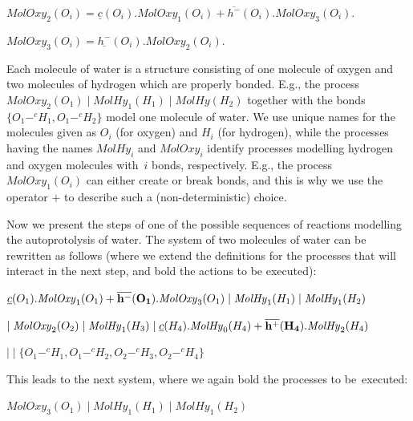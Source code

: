\documentclass[runningheads]{llncs}
\newcommand{\MolOxy}{\mathit{MolOxy}}
\newcommand{\MolHy}{\mathit{MolHy}}
\begin{document}
$\MolOxy_2(O_i) = \underline{c}(O_i).\MolOxy_1(O_i) +\overline{h^-}(O_i).\MolOxy_3(O_i)$.
\vspace{1mm}

$\MolOxy_3(O_i) = \underline{h^-}(O_i).\MolOxy_2(O_i)$.
\vspace{1mm}

\noindent 
Each molecule of water is a structure consisting of one molecule of oxygen 
and two molecules of hydrogen which are properly bonded. E.g., the process 
$\MolOxy_2(O_1) \mid \MolHy_1(H_1) \mid \MolHy(H_2) $ together with the 
bonds $\{O_1 -^c H_1, O_1 -^c H_2\}$ model one molecule of water. We use 
unique names for the molecules given as $O_i$ (for oxygen) and $H_i$ (for 
hydrogen), while the processes having the names $\MolHy_i$ and $\MolOxy_i$ 
identify processes modelling hydrogen and oxygen molecules with~$i$ bonds, 
respectively. E.g., the process $MolOxy_1(O_i)$ can either create or break 
bonds, and this is why we use the operator $+$ to describe such a  
(non-deterministic) choice.

Now we present the steps of one of the possible sequences of reactions modelling the 
autoprotolysis of water. The system of two molecules of water can be 
rewritten as follows (where we extend the definitions for the processes 
that will interact in the next step, and bold the actions to be executed):

\begin{center}$\underline{c}(O_1).\MolOxy_1(O_1) +{\bf \overline{h^-}(O_1)}.\MolOxy_3(O_1) \mid \MolHy_1(H_1) \mid \MolHy_1(H_2) $
\end{center}

\begin{center}$\mid \MolOxy_2(O_2) \mid \MolHy_1(H_3) \mid \underline{c}(H_4).
\MolHy_0(H_4) + {\bf \overline{h^+}(H_4)}.\MolHy_2(H_4)$
\end{center}


\begin{center}$\mid\mid \{O_1 -^c H_1, O_1 -^c H_2, O_2 -^c H_3, O_2 -^c H_4\}$
\end{center}

\noindent 
This leads to the next system, where we again bold the processes to be~executed:
\begin{center}$\MolOxy_3(O_1) \mid \MolHy_1(H_1) \mid \MolHy_1(H_2) $
\end{center}
\end{document}
